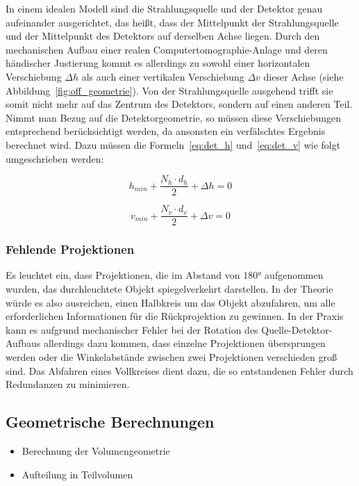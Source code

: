 In einem idealen Modell sind die Strahlungsquelle und der Detektor genau aufeinander ausgerichtet, das heißt, dass der
Mittelpunkt der Strahlungsquelle und der Mittelpunkt des Detektors auf derselben Achse liegen. Durch den mechanischen
Aufbau einer realen Computertomographie-Anlage und deren händischer Justierung kommt es allerdings zu sowohl
einer horizontalen Verschiebung $\Delta h$ als auch einer vertikalen Verschiebung $\Delta v$ dieser Achse (siehe
Abbildung~\ref{fig:off_geometrie}). Von der Strahlungsquelle ausgehend trifft sie somit nicht mehr auf das Zentrum des
Detektors, sondern auf einen anderen Teil. Nimmt man Bezug auf die Detektorgeometrie, so müssen diese Verschiebungen
entsprechend berücksichtigt werden, da ansonsten ein verfälschtes Ergebnis berechnet wird. Dazu müssen die
Formeln~\ref{eq:det_h} und~\ref{eq:det_v} wie folgt umgeschrieben werden:

\begin{equation} 
    h_{min} + \frac{N_h \cdot d_h}{2} + \Delta h = 0
\end{equation}

\begin{equation}
    v_{min} + \frac{N_v \cdot d_v}{2}  + \Delta v = 0
\end{equation}

\subsubsection{Fehlende Projektionen}

Es leuchtet ein, dass Projektionen, die im Abstand von 180° aufgenommen wurden, das durchleuchtete Objekt
spiegelverkehrt darstellen. In der Theorie würde es also ausreichen, einen Halbkreis um das Objekt abzufahren, um alle
erforderlichen Informationen für die Rückprojektion zu gewinnen. In der Praxis kann es aufgrund mechanischer Fehler bei
der Rotation des Quelle-Detektor-Aufbaus allerdings dazu kommen, dass einzelne Projektionen übersprungen werden oder die
Winkelabstände zwischen zwei Projektionen verschieden groß sind. Das Abfahren eines Vollkreises dient dazu, die so
entstandenen Fehler durch Redundanzen zu minimieren.

\subsection{Geometrische Berechnungen}\label{ssec:geometrie}

\begin{itemize}
    \item Berechnung der Volumengeometrie
    \item Aufteilung in Teilvolumen
\end{itemize}


